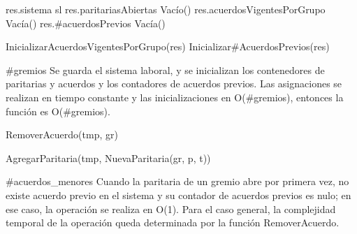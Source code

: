 {
	\state res.sistema \asig sl								
	\state res.paritariasAbiertas \asig Vacío()				
	\state res.acuerdosVigentesPorGrupo \asig Vacía()		
	\state res.\#acuerdosPrevios \asig Vacía()					
	\state

	\state InicializarAcuerdosVigentesPorGrupo(res)			
	\state Inicializar\#AcuerdosPrevios(res)						
}
{\#gremios}
{ Se guarda el sistema laboral, y se inicializan los contenedores de paritarias y acuerdos y los contadores de acuerdos previos. Las asignaciones se realizan en tiempo constante y las inicializaciones en O(\#gremios), entonces la función es O(\#gremios). }

{
					
		\state RemoverAcuerdo(tmp, gr)							
	\endif
	\state

	\state AgregarParitaria(tmp, NuevaParitaria(gr, p, t))		
}
{\#acuerdos\_menores}
{ Cuando la paritaria de un gremio abre por primera vez, no existe acuerdo previo en el sistema y su contador de acuerdos previos es nulo; en ese caso, la operación se realiza en O(1). Para el caso general, la complejidad temporal de la operación queda determinada por la función RemoverAcuerdo. }

